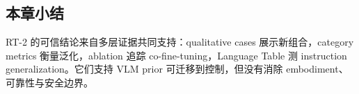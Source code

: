 
\subsection{本章小结}

RT-2 的可信结论来自多层证据共同支持：qualitative cases 展示新组合，category metrics 衡量泛化，ablation 追踪 co-fine-tuning，Language Table 测 instruction generalization。它们支持 VLM prior 可迁移到控制，但没有消除 embodiment、可靠性与安全边界。

